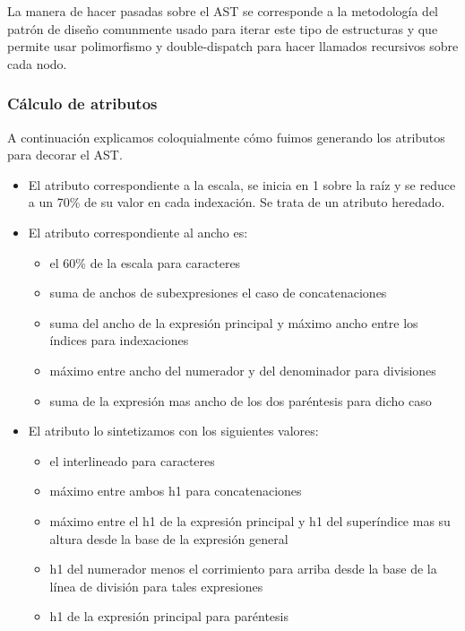La manera de hacer pasadas sobre el AST se corresponde a la metodología del patrón de diseño \emph{} comunmente usado para iterar este tipo de estructuras y que permite usar polimorfismo y double-dispatch para hacer llamados recursivos sobre cada nodo.

\subsubsection{Cálculo de atributos}
A continuación explicamos coloquialmente cómo fuimos generando los atributos para decorar el AST.

\begin{itemize}
	\item El atributo \textbf{} correspondiente a la escala, se inicia en 1 sobre la raíz y se reduce a un 70\% de su valor en cada indexación. Se trata de un atributo heredado.

	\item El atributo \textbf{} correspondiente al ancho es:
	\begin{itemize}
		\item el 60\% de la escala para caracteres
		\item suma de anchos de subexpresiones el caso de concatenaciones
		\item suma del ancho de la expresión principal y máximo ancho entre los índices para indexaciones
		\item máximo entre ancho del numerador y del denominador para divisiones
		\item suma de la expresión mas ancho de los dos paréntesis para dicho caso
	\end{itemize}

	\item El atributo \textbf{} lo sintetizamos con los siguientes valores:
	\begin{itemize}
		\item el interlineado para caracteres
		\item máximo entre ambos h1 para concatenaciones
		\item máximo entre el h1 de la expresión principal y h1 del superíndice mas su altura desde la base de la expresión general
		\item h1 del numerador menos el corrimiento para arriba desde la base de la línea de división para tales expresiones
		\item h1 de la expresión principal para paréntesis
	\end{itemize}


\end{itemize}
